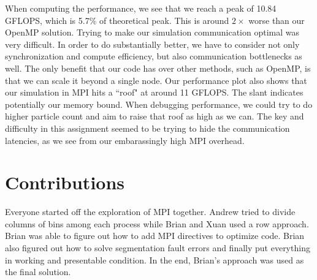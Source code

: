 \documentclass{article}
\begin{document}
When computing the performance, we see that we reach a peak of 10.84 GFLOPS, which is 5.7\% of theoretical peak. This is around $2\times$ worse than our OpenMP solution. Trying to make our simulation communication optimal was very difficult. In order to do substantially better, we have to consider not only synchronization and compute efficiency, but also communication bottlenecks as well. The only benefit that our code has over other methods, such as OpenMP, is that we can scale it beyond a single node. Our performance plot also shows that our simulation in MPI hits a ``roof" at around 11 GFLOPS. The slant indicates potentially our memory bound. When debugging performance, we could try to do higher particle count and aim to raise that roof as high as we can. The key and difficulty in this assignment seemed to be trying to hide the communication latencies, as we see from our embarassingly high MPI overhead.

\section{Contributions}
Everyone started off the exploration of MPI together. Andrew tried to divide columns of bins among each process while Brian and Xuan used a row approach. Brian was able to figure out how to add MPI directives to optimize code. Brian also figured out how to solve segmentation fault errors and finally put everything in working and presentable condition. In the end, Brian's approach was used as the final solution.



\end{document}
